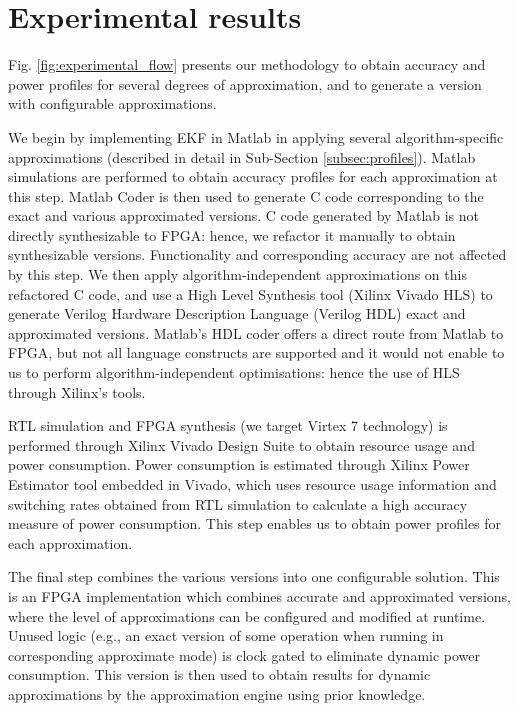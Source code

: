 \section{Experimental results}\label{experiments}

Fig. \ref{fig:experimental_flow} presents our methodology to obtain accuracy and power profiles for several degrees of approximation, and to generate a version with configurable approximations. 
\par We begin by implementing EKF in Matlab in applying several algorithm-specific approximations (described in detail in Sub-Section \ref{subsec:profiles}). Matlab simulations are performed to obtain accuracy profiles for each approximation at this step. Matlab Coder is then used to generate C code corresponding to the exact and various approximated versions. C code generated by Matlab is not directly synthesizable to FPGA: hence, we refactor it manually to obtain synthesizable versions. Functionality and corresponding accuracy are not affected by this step. We then apply algorithm-independent approximations on this refactored C code, and use a High Level Synthesis tool (Xilinx Vivado HLS) to generate Verilog Hardware Description Language (Verilog HDL) exact and approximated versions. Matlab's HDL coder offers a direct route from Matlab to FPGA, but not all language constructs are supported and it would not enable to us to perform algorithm-independent optimisations: hence the use of HLS through Xilinx's tools.
\par RTL simulation and FPGA synthesis (we target Virtex 7 technology) is performed through Xilinx Vivado Design Suite to obtain resource usage and power consumption. Power consumption is estimated through Xilinx Power Estimator tool embedded in Vivado, which uses resource usage information and switching rates obtained from RTL simulation to calculate a high accuracy measure of power consumption. This step enables us to obtain power profiles for each approximation.
\par The final step combines the various versions into one configurable solution. This is an FPGA implementation which combines accurate and approximated versions, where the level of approximations can be configured and modified at runtime. Unused logic (e.g., an exact version of some operation when running in corresponding approximate mode) is clock gated to eliminate dynamic power consumption. This version is then used to obtain results for dynamic approximations by the approximation engine using prior knowledge.  


